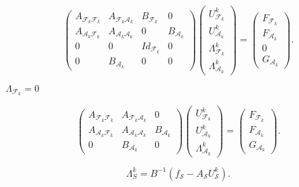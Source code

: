 \documentclass{article}
\begin{document}
\begin{equation*} \begin{pmatrix} A_{\mathcal{F}_k\mathcal{F}_k} & A_{\mathcal{F}_k\mathcal{A}_k} & B_{\mathcal{F}_k} & 0\\ A_{\mathcal{A}_k\mathcal{F}_k} & A_{\mathcal{A}_k\mathcal{A}_k} & 0 & B_{\mathcal{A}_k}\\ 0 & 0 & Id_{\mathcal{F}_k} & 0\\ 0 & B_{\mathcal{A}_k} & 0 & 0 \end{pmatrix} \begin{pmatrix} U^k_{\mathcal{F}_k}\\ U^k_{\mathcal{A}_k}\\ \Lambda^k_{\mathcal{F}_k}\\ \Lambda^k_{\mathcal{A}_k} \end{pmatrix} = \begin{pmatrix} F_{\mathcal{F}_k}\\ F_{\mathcal{A}_k}\\ 0\\ G_{\mathcal{A}_k} \end{pmatrix}. \end{equation*}
\pagebreak

$\Lambda_{\mathcal{F}_k} = 0$
\pagebreak

\begin{equation*} \begin{pmatrix} A_{\mathcal{F}_k\mathcal{F}_k} & A_{\mathcal{F}_k\mathcal{A}_k} & 0\\ A_{\mathcal{A}_k\mathcal{F}_k} & A_{\mathcal{A}_k\mathcal{A}_k} & B_{\mathcal{A}_k}\\ 0 & B_{\mathcal{A}_k} & 0 \end{pmatrix} \begin{pmatrix} U^k_{\mathcal{F}_k}\\ U^k_{\mathcal{A}_k}\\ \Lambda^k_{\mathcal{A}_k} \end{pmatrix} = \begin{pmatrix} F_{\mathcal{F}_k}\\ F_{\mathcal{A}_k}\\ G_{\mathcal{A}_k} \end{pmatrix}. \end{equation*}
\pagebreak

\begin{equation*} \Lambda^k_S = B^{-1}\left(f_{\mathcal{S}} - A_{\mathcal{S}}U^k_{\mathcal{S}}\right). \end{equation*}
\pagebreak
\end{document}
